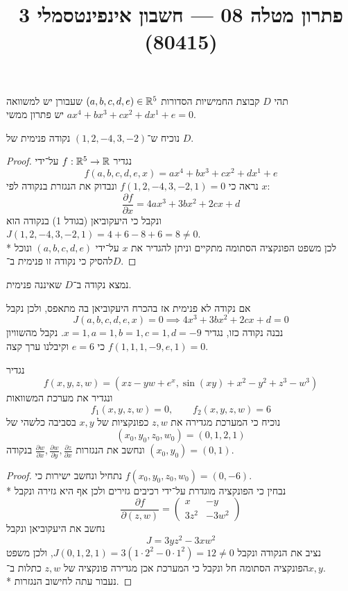 
\title{פתרון מטלה 08 --- חשבון אינפינטסמלי 3 (80415)}


\maketitle
\maketitleprint{}

\Question{}
תהי $D$ קבוצת החמישיות הסדורות $(a, b, c, d, e) \in \mathbb{R}^5$ שעבורן יש למשוואה $ax^4 + bx^3 + cx^2 + dx^1 + e = 0$ יש פתרון ממשי.

\Subquestion{}
נוכיח ש־$(1, 2, -4, 3, -2)$ נקודה פנימית של $D$.
\begin{proof}
	נגדיר $f : \mathbb{R}^5 \to \mathbb{R}$ על־ידי
	\[
		f(a, b, c, d, e, x) = ax^4 + bx^3 + cx^2 + dx^1 + e
	\]
	נראה כי $f(1, 2, -4, 3, -2, 1) = 0$ ונבדוק את הנגזרת בנקודה לפי $x$:
	\[
		\frac{\partial f}{\partial x} = 4ax^3 + 3bx^2 + 2cx + d
	\]
	ונקבל כי היעקוביאן (בגודל 1) בנקודה הוא $J(1, 2, -4, 3, -2, 1) = 4 + 6 - 8 + 6 = 8 \ne 0$. \\*
	לכן משפט הפונקציה הסתומה מתקיים וניתן להגדיר את $x$ על־ידי $(a, b, c, d, e)$ ונוכל להסיק כי נקודה זו פנימית ב־$D$.
\end{proof}

\Subquestion{}
נמצא נקודה ב־$D$ שאיננה פנימית.

אם נקודה לא פנימית אז בהכרח היעקוביאן בה מתאפס, ולכן נקבל
\[
	J(a, b, c, d, e, x) = 0
	\implies
	4x^3 + 3bx^2 + 2cx + d = 0
\]
נבנה נקודה כזו, נגדיר $x = 1, a = 1, b = 1, c = 1, d = -9$.
נקבל מהשוויון $f(1, 1, 1, -9, e, 1) = 0$ כי $e = 6$ וקיבלנו ערך קצה.

\Question{}
נגדיר
\[
	f(x, y, z, w) = (xz - yw + e^x, \sin(xy) + x^2 - y^2 + z^3 - w^3)
\]
ונגדיר את מערכת המשוואות
\[
	f_1(x, y, z, w) = 0,
	\qquad
	f_2(x, y, z, w) = 6
\]
נוכיח כי המערכת מגדירה את $z, w$ כפונקציות של $x, y$ בסביבה כלשהי של
\[
	(x_0, y_0, z_0, w_0) = (0, 1, 2, 1)
\]
ונחשב את הנגזרות $\frac{\partial w}{\partial x}, \frac{\partial w}{\partial y}, \frac{\partial z}{\partial x}$ בנקודה $(x_0, y_0) = (0, 1)$.
\begin{proof}
	נתחיל ונחשב ישירות כי $f(x_0, y_0, z_0, w_0) = (0, -6)$. \\*
	נבחין כי הפונקציה מוגדרת על־ידי רכיבים גזירים ולכן אף היא גזירה ונקבל
	\[
		\frac{\partial f}{\partial (z, w)}
		= \begin{pmatrix}
			x & -y \\
			3z^2 & -3w^2
		\end{pmatrix}
	\]
	נחשב את היעקוביאן ונקבל
	\[
		J = 3yz^2 - 3xw^2
	\]
	נציב את הנקודה ונקבל $J(0, 1, 2, 1) = 3(1 \cdot 2^2 - 0 \cdot 1^2) = 12 \ne 0$, ולכן משפט הפונקציה הסתומה חל ונקבל כי המערכת אכן מגדירה פונקציה של $z, w$ כתלות ב־$x, y$. \\*
	נעבור עתה לחישוב הנגזרות.
\end{proof}


